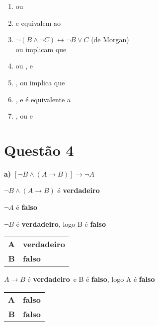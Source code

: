 \documentclass{article}
\begin{document}
\begin{enumerate}[wide, labelindent=0pt, label=\textbf{\alph*)}]
    \item \fB ou \fnc
    \item \fC e \fna equivalem ao \fb
    \item $\neg (B \wedge \neg C) \leftrightarrow
    \neg B \vee C$ (de Morgan)\\
         \indent \fnB ou \fc implicam que \fa
    \item \fA ou \fb, e \fnc
    \item \fnB, ou \fa implica que \fc
    \item \fC, e \fna é equivalente a \fb
    \item \fA, ou \fb e \fnc
\end{enumerate}

\section*{Questão 4}

\newcommand\vv{\textbf{verdadeiro}}
\newcommand\ff{\textbf{falso}}

\noindent
\textbf{a)} $[\neg B \wedge (A \rightarrow B)] \rightarrow \neg A$

\medskip
\noindent
$\neg B \wedge (A \rightarrow B)$ é \vv

\noindent
$\neg A$ é \ff

\medskip
\noindent
\dotfill
\medskip

\noindent
$\neg B$ é \vv, logo B é \ff

\medskip
\begin{tabular}{|r l|}
\hline
    \textbf{A} & \vv \\
    \textbf{B} & \ff \\
\hline
\end{tabular}

\medskip
\noindent
\dotfill
\medskip

\noindent
$A \rightarrow B$ é \vv\ e B é \ff, logo A é \ff

\medskip
\begin{tabular}{|r l|}
\hline
    \textbf{A} & \ff \\
    \textbf{B} & \ff \\
\hline
\end{tabular}

\medskip
\noindent
\dotfill
\medskip
\end{document}
